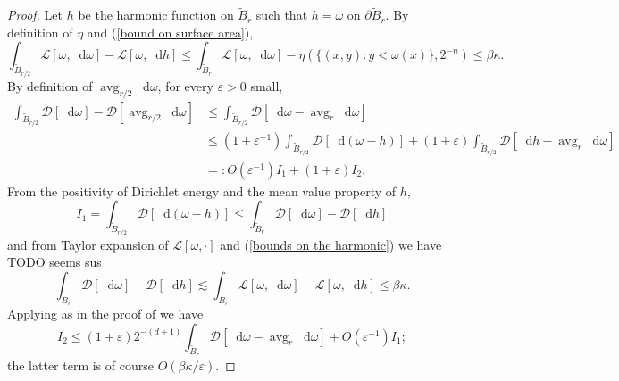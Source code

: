 \documentclass[reqno,12pt,letterpaper]{amsart}
\DeclareMathOperator{\avg}{avg}
\newcommand*\dif{\mathop{}\!\mathrm{d}}
\newcommand{\Lagrange}{\mathscr L}
\newcommand{\DirL}{\mathscr D}
\theoremstyle{definition}
\numberwithin{equation}{section}
\begin{document}
\begin{proof}
Let $h$ be the harmonic function on $\tilde B_r$ such that $h = \omega$ on $\partial \tilde B_r$.
By definition of $\eta$ and (\ref{bound on surface area}),
\begin{equation}\label{bounds on the harmonic}
\int_{\tilde B_{r/2}} \Lagrange[\omega, \dif \omega] - \Lagrange[\omega, \dif h] \leq \int_{\tilde B_r} \Lagrange[\omega, \dif \omega] - \eta(\{(x, y): y < \omega(x)\}, 2^{-n}) \leq \beta \kappa.
\end{equation}
By definition of $\avg_{r/2} \dif \omega$, for every $\varepsilon > 0$ small,
\begin{align*}
\int_{\tilde B_{r/2}} \DirL[\dif \omega] - \DirL[\avg_{r/2} \dif \omega]
&\leq \int_{\tilde B_{r/2}} \DirL[\dif \omega - \avg_r \dif\omega] \\
&\leq (1 + \varepsilon^{-1}) \int_{\tilde B_{r/2}} \DirL[\dif (\omega - h)] +(1 + \varepsilon) \int_{\tilde B_{r/2}} \DirL[\dif h - \avg_r \dif \omega] \\
&=: O(\varepsilon^{-1}) I_1 + (1 + \varepsilon) I_2.
\end{align*}
From the positivity of Dirichlet energy and the mean value property of $h$,
$$I_1 = \int_{\tilde B_{r/2}} \DirL[\dif (\omega - h)] \leq \int_{\tilde B_r} \DirL[\dif \omega] - \DirL[\dif h]$$
and from Taylor expansion of $\Lagrange[\omega, \cdot]$ and (\ref{bounds on the harmonic}) we have TODO seems sus
$$\int_{\tilde B_r} \DirL[\dif \omega] - \DirL[\dif h] \lesssim \int_{\tilde B_r} \Lagrange[\omega, \dif \omega] - \Lagrange[\omega, \dif h] \leq \beta \kappa.$$
Applying \cite[Lemma 4.1]{Miranda66} as in the proof of \cite[Lemma 4.2]{Miranda66} we have
$$I_2 \leq (1 + \varepsilon) 2^{-(d + 1)} \int_{\tilde B_r} \DirL[\dif \omega - \avg_r \dif \omega] + O(\varepsilon^{-1}) I_1;$$
the latter term is of course $O(\beta \kappa/\varepsilon)$.

\end{proof}


\printbibliography
\end{document}
